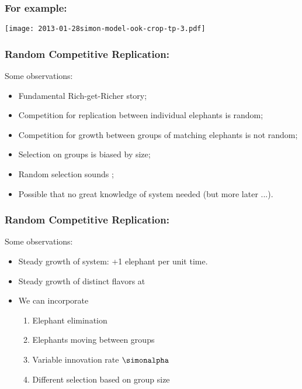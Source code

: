 \begin{frame}
  \frametitle{For example:}

  \begin{block}{}
    \texttt{[image: 2013-01-28simon-model-ook-crop-tp-3.pdf]}
  \end{block}
  
\end{frame}

\begin{frame}
  \frametitle{Random Competitive Replication:}

  \begin{block}{Some observations:}
  \begin{itemize}
  \item<+-> 
    Fundamental \alert{Rich-get-Richer} story;
  \item<+-> 
    Competition for replication between individual elephants is random;
  \item<+-> 
    Competition for growth between groups of matching elephants is not random;
  \item<+-> 
    Selection on groups is biased by size;
  \item<+-> 
    Random selection sounds ;
  \item<+-> 
    Possible that no great knowledge of system needed (but more later ...).
  \end{itemize}
  \end{block}


\end{frame}

\begin{frame}
  \frametitle{Random Competitive Replication:}

  \begin{block}{Some observations:}
  \begin{itemize}
  \item<1-> Steady growth of system: +1 elephant per unit time.
  \item<2-> Steady growth of distinct flavors at 
  \item<3-> We can incorporate 
    \begin{enumerate}
    \item<4-> Elephant elimination
    \item<5-> Elephants moving between groups
    \item<6-> Variable innovation rate $\simonalpha$
    \item<7-> Different selection based on group size\\
    \end{enumerate}
  \end{itemize}
  \end{block}

\end{frame}

